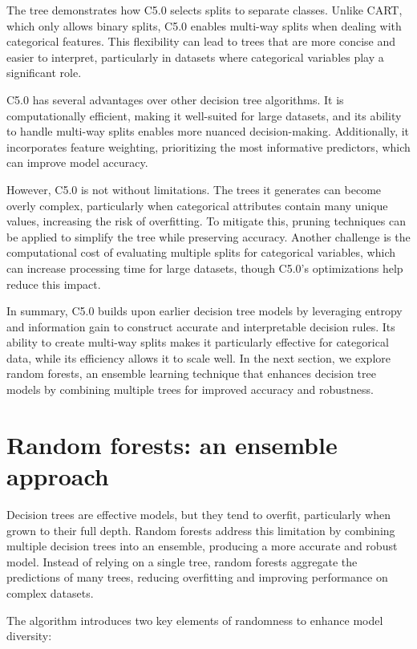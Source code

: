 \documentclass[
]{book}
\theoremstyle{definition}
\theoremstyle{definition}
\theoremstyle{definition}
\theoremstyle{definition}
\theoremstyle{remark}
\begin{document}
The tree demonstrates how C5.0 selects splits to separate classes. Unlike CART, which only allows binary splits, C5.0 enables multi-way splits when dealing with categorical features. This flexibility can lead to trees that are more concise and easier to interpret, particularly in datasets where categorical variables play a significant role.

C5.0 has several advantages over other decision tree algorithms. It is computationally efficient, making it well-suited for large datasets, and its ability to handle multi-way splits enables more nuanced decision-making. Additionally, it incorporates feature weighting, prioritizing the most informative predictors, which can improve model accuracy.

However, C5.0 is not without limitations. The trees it generates can become overly complex, particularly when categorical attributes contain many unique values, increasing the risk of overfitting. To mitigate this, pruning techniques can be applied to simplify the tree while preserving accuracy. Another challenge is the computational cost of evaluating multiple splits for categorical variables, which can increase processing time for large datasets, though C5.0's optimizations help reduce this impact.

In summary, C5.0 builds upon earlier decision tree models by leveraging entropy and information gain to construct accurate and interpretable decision rules. Its ability to create multi-way splits makes it particularly effective for categorical data, while its efficiency allows it to scale well. In the next section, we explore random forests, an ensemble learning technique that enhances decision tree models by combining multiple trees for improved accuracy and robustness.

\section{Random forests: an ensemble approach}\label{random-forests-an-ensemble-approach}

Decision trees are effective models, but they tend to overfit, particularly when grown to their full depth. Random forests address this limitation by combining multiple decision trees into an ensemble, producing a more accurate and robust model. Instead of relying on a single tree, random forests aggregate the predictions of many trees, reducing overfitting and improving performance on complex datasets.

The algorithm introduces two key elements of randomness to enhance model diversity:
\end{document}
